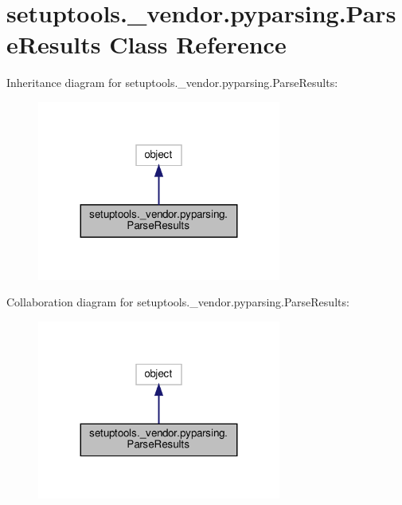 \hypertarget{classsetuptools_1_1__vendor_1_1pyparsing_1_1ParseResults}{}\section{setuptools.\+\_\+vendor.\+pyparsing.\+Parse\+Results Class Reference}
\label{classsetuptools_1_1__vendor_1_1pyparsing_1_1ParseResults}


Inheritance diagram for setuptools.\+\_\+vendor.\+pyparsing.\+Parse\+Results\+:
\nopagebreak
\begin{figure}[H]
\begin{center}
\leavevmode
\includegraphics[width=227pt]{classsetuptools_1_1__vendor_1_1pyparsing_1_1ParseResults__inherit__graph}
\end{center}
\end{figure}


Collaboration diagram for setuptools.\+\_\+vendor.\+pyparsing.\+Parse\+Results\+:
\nopagebreak
\begin{figure}[H]
\begin{center}
\leavevmode
\includegraphics[width=227pt]{classsetuptools_1_1__vendor_1_1pyparsing_1_1ParseResults__coll__graph}
\end{center}
\end{figure}
